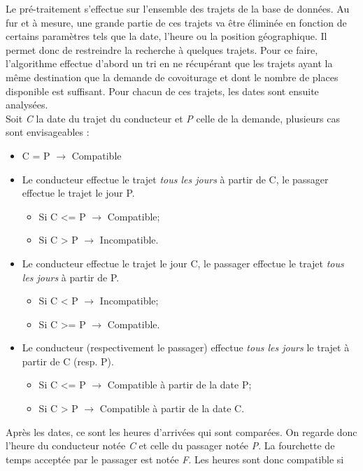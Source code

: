 \documentclass[12pt, a4paper, oneside]{article}
\begin{document}
     \indent Le pré-traitement s'effectue sur l'ensemble des trajets de la base de données. Au fur et à mesure, une grande partie de ces trajets va être éliminée en fonction de certains paramètres tels que la date, l'heure ou la position géographique. Il permet donc de restreindre la recherche à quelques trajets. Pour ce faire, l'algorithme effectue d'abord un tri en ne récupérant que les trajets ayant la même destination que la demande de covoiturage et dont le nombre de places disponible est suffisant. Pour chacun de ces trajets, les dates sont ensuite analysées.\\
     Soit \textit{C} la date du trajet du conducteur et \textit{P} celle de la demande, plusieurs cas sont envisageables :\\
    \begin{itemize}
        \item C = P $\rightarrow$ Compatible
        \item Le conducteur effectue le trajet \textit{tous les jours} à partir de C, le passager effectue le trajet le jour P. 
        \begin{itemize}
            \item Si C <= P $\rightarrow$ Compatible;
            \item Si C > P $\rightarrow$ Incompatible.
        \end{itemize}
        \item Le conducteur effectue le trajet le jour C, le passager effectue le trajet \textit{tous les jours} à partir de P.
        \begin{itemize}
            \item Si C < P $\rightarrow$ Incompatible; 
            \item Si C >= P $\rightarrow$ Compatible.
        \end{itemize}
        \item Le conducteur (respectivement le passager) effectue \textit{tous les jours} le trajet à partir de C (resp. P).
        \begin{itemize}
            \item Si C <= P $\rightarrow$ Compatible à partir de la date P;
            \item Si C > P $\rightarrow$ Compatible à partir de la date C.\\
        \end{itemize}
    \end{itemize}
    Après les dates, ce sont les heures d'arrivées qui sont comparées. On regarde donc l'heure du conducteur notée \textit{C} et celle du passager notée \textit{P}. La fourchette de temps acceptée par le passager est notée \textit{F}. Les heures sont donc compatible si 
\end{document}
